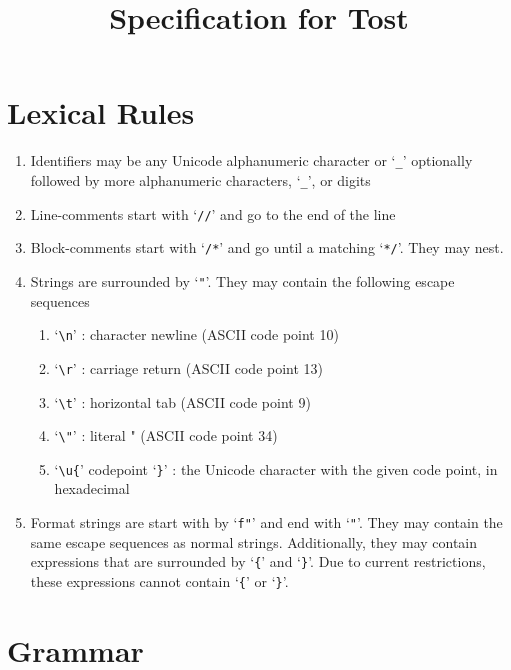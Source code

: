 \documentclass[10pt]{artikel1}
\title{Specification for Tost}
\author{}
\begin{document}
\maketitle

\section*{Lexical Rules}

\begin{enumerate}
    \item Identifiers may be any Unicode alphanumeric character or `\verb|_|' optionally followed by more alphanumeric characters, `\verb|_|', or digits
    \item Line-comments start with `\verb|//|' and go to the end of the line
    \item Block-comments start with `\verb|/*|' and go until a matching `\verb|*/|'. They may nest.
    \item Strings are surrounded by `\verb|"|'. They may contain the following escape sequences \begin{enumerate}
              \item `\verb|\n|' : character newline (ASCII code point 10)
              \item `\verb|\r|' : carriage return (ASCII code point 13)
              \item `\verb|\t|' : horizontal tab (ASCII code point 9)
              \item `\verb|\"|' : literal " (ASCII code point 34)
              \item `\verb|\u{|' codepoint `\verb|}|' : the Unicode character with the given code point, in hexadecimal
          \end{enumerate}

    \item Format strings are start with by `\verb|f"|' and end with `\verb|"|'. They may contain the same escape sequences as normal strings. Additionally, they may contain expressions that are surrounded by `\verb|{|' and `\verb|}|'. Due to current restrictions, these expressions cannot contain `\verb|{|' or `\verb|}|'.

\end{enumerate}

\section*{Grammar}
\setlength{\grammarparsep}{20pt plus 1pt minus 1pt}
\setlength{\grammarindent}{12em}
\end{document}
